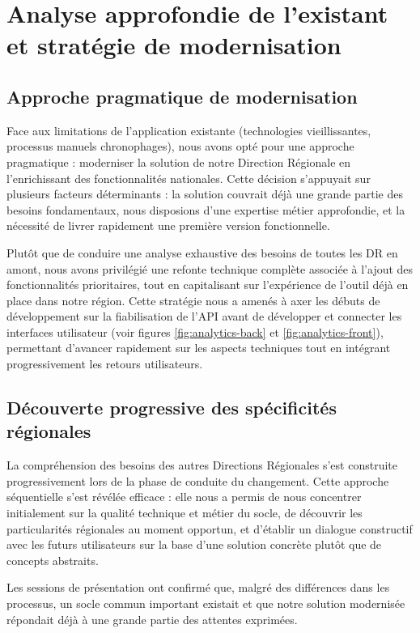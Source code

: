 \section{Analyse approfondie de l'existant et stratégie de modernisation}

\subsection{Approche pragmatique de modernisation}
Face aux limitations de l'application existante (technologies vieillissantes, processus manuels chronophages), nous avons opté pour une approche pragmatique : moderniser la solution de notre Direction Régionale en l'enrichissant des fonctionnalités nationales.
Cette décision s'appuyait sur plusieurs facteurs déterminants : la solution couvrait déjà une grande partie des besoins fondamentaux, nous disposions d'une expertise métier approfondie, et la nécessité de livrer rapidement une première version fonctionnelle.

Plutôt que de conduire une analyse exhaustive des besoins de toutes les DR en amont, nous avons privilégié une refonte technique complète associée à l'ajout des fonctionnalités prioritaires, tout en capitalisant sur l'expérience de l'outil déjà en place dans notre région. Cette stratégie nous a amenés à axer les débuts de développement sur la fiabilisation de l'API avant de développer et connecter les interfaces utilisateur (voir figures \ref{fig:analytics-back} et \ref{fig:analytics-front}), permettant d'avancer rapidement sur les aspects techniques tout en intégrant progressivement les retours utilisateurs.

\subsection{Découverte progressive des spécificités régionales}
La compréhension des besoins des autres Directions Régionales s'est construite progressivement lors de la phase de conduite du changement.
Cette approche séquentielle s'est révélée efficace : elle nous a permis de nous concentrer initialement sur la qualité technique et métier du socle, de découvrir les particularités régionales au moment opportun, et d'établir un dialogue constructif avec les futurs utilisateurs sur la base d'une solution concrète plutôt que de concepts abstraits.

Les sessions de présentation ont confirmé que, malgré des différences dans les processus, un socle commun important existait et que notre solution modernisée répondait déjà à une grande partie des attentes exprimées.


